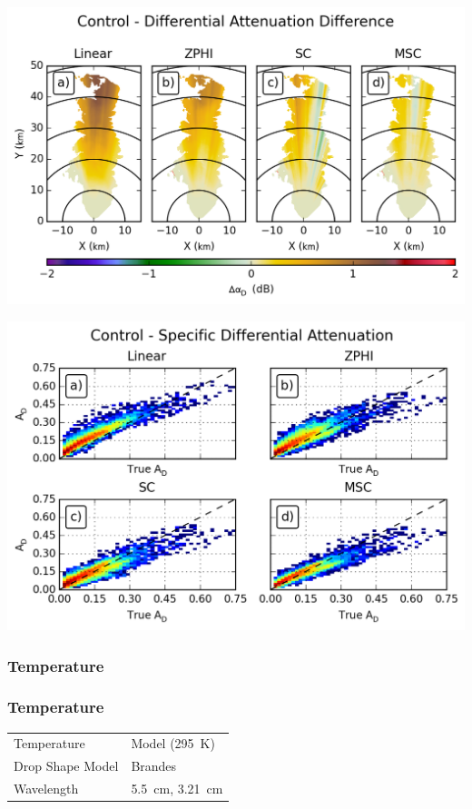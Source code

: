 \documentclass[red]{beamer}
\begin{document}
\begin{frame}
    \begin{center}
        \includegraphics[scale=0.7]{figures/C_Control_Differential_Attenuation_Difference}
    \end{center}
\end{frame}

\begin{frame}
    \begin{center}
        \includegraphics[scale=0.7]{figures/C_Control_Specific_Differential_Attenuation_scatter}
    \end{center}
\end{frame}

\subsubsection{Temperature}
\begin{frame}
	\frametitle{Temperature}
	\begin{center}
	    \begin{tabular}{ | l | l | }
	        \hline
	        Temperature & Model (\SI{295}{\kelvin}) \\
	        Drop Shape Model & Brandes \\
	        Wavelength & \SI{5.5}{\centi\meter}, \SI{3.21}{\centi\meter} \\
			\hline
	    \end{tabular}
	\end{center}	
\end{frame}
\end{document}
